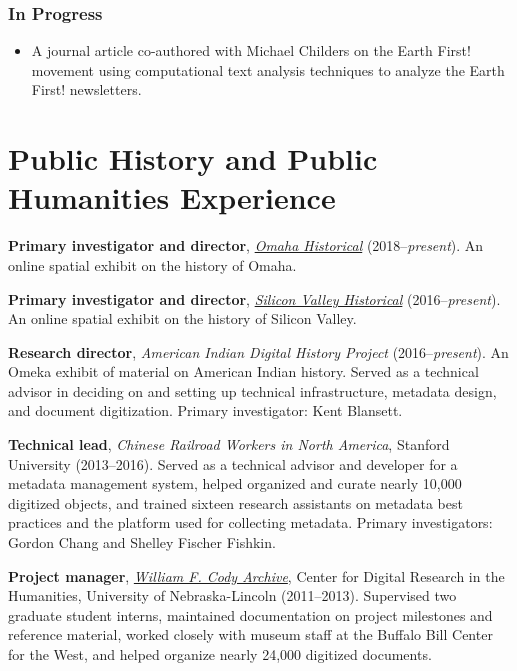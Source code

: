\subsubsection{In Progress}\label{in-progress}

\begin{itemize}
\tightlist
\item
  A journal article co-authored with Michael Childers on the Earth
  First! movement using computational text analysis techniques to
  analyze the Earth First! newsletters.
\end{itemize}

\newpage

\section{Public History and Public Humanities
Experience}\label{public-history-and-public-humanities-experience}

\textbf{Primary investigator and director},
\emph{\href{http://svhistorical.org}{Omaha Historical}}
(2018--\emph{present}). An online spatial exhibit on the history of
Omaha.

\textbf{Primary investigator and director},
\emph{\href{http://svhistorical.org}{Silicon Valley Historical}}
(2016--\emph{present}). An online spatial exhibit on the history of
Silicon Valley.

\textbf{Research director}, \emph{American Indian Digital History
Project} (2016--\emph{present}). An Omeka exhibit of material on
American Indian history. Served as a technical advisor in deciding on
and setting up technical infrastructure, metadata design, and document
digitization. Primary investigator: Kent Blansett.

\textbf{Technical lead}, \emph{Chinese Railroad Workers in North
America}, Stanford University (2013--2016). Served as a technical
advisor and developer for a metadata management system, helped organized
and curate nearly 10,000 digitized objects, and trained sixteen research
assistants on metadata best practices and the platform used for
collecting metadata. Primary investigators: Gordon Chang and Shelley
Fischer Fishkin.

\textbf{Project manager}, \emph{\href{http://codyarchive.org}{William F.
Cody Archive}}, Center for Digital Research in the Humanities,
University of Nebraska-Lincoln (2011--2013). Supervised two graduate
student interns, maintained documentation on project milestones and
reference material, worked closely with museum staff at the Buffalo Bill
Center for the West, and helped organize nearly 24,000 digitized
documents.


